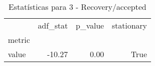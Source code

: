 \begin{table}[htbp]
\caption{Estatísticas para 3 - Recovery/accepted}
\label{tab:3_-_recovery_accepted_adf_test}
\begin{tabular}{lrrr}
\toprule
 & adf_stat & p_value & stationary \\
metric &  &  &  \\
\midrule
value & -10.27 & 0.00 & True \\
\bottomrule
\end{tabular}
\end{table}
